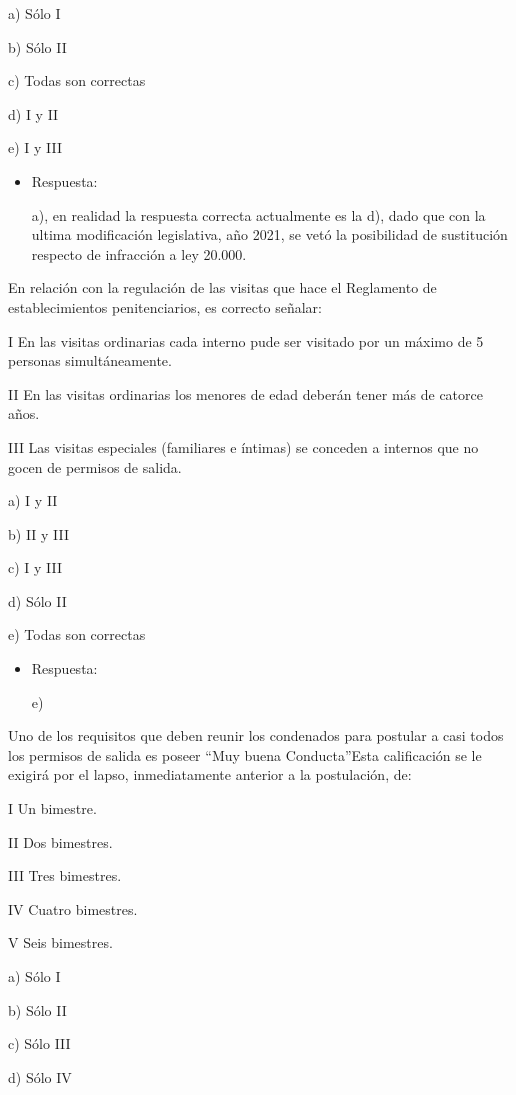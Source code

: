 \documentclass[letterpaper, 11pt]{article}
\begin{document}
a) Sólo I

b) Sólo II

c) Todas son correctas

d) I y II

e) I y III

\begin{itemize}
\item Respuesta:

a), en realidad la respuesta correcta actualmente es la d), dado que
con la ultima modificación legislativa, año 2021, se vetó la
posibilidad de sustitución respecto de infracción a ley 20.000.
\end{itemize}


En relación con la regulación de las visitas que hace el Reglamento de
establecimientos penitenciarios, es correcto señalar:


I En las visitas ordinarias cada interno pude ser visitado por un
máximo de 5 personas simultáneamente.

II En las visitas ordinarias los menores de edad deberán tener más de
catorce años.

III Las visitas especiales (familiares e íntimas) se conceden a
internos que no gocen de permisos de salida.



a) I y II

b) II y III

c) I y III

d) Sólo II

e) Todas son correctas

\begin{itemize}
\item Respuesta:

e)
\end{itemize}


Uno de los requisitos que deben reunir los condenados para postular a
casi todos los permisos de salida es poseer “Muy buena Conducta”Esta
calificación se le exigirá por el lapso, inmediatamente anterior a la
postulación, de:

I Un bimestre.

II Dos bimestres.

III Tres bimestres.

IV Cuatro bimestres.

V Seis bimestres.


a) Sólo I

b) Sólo II

c) Sólo III

d) Sólo IV
\end{document}
